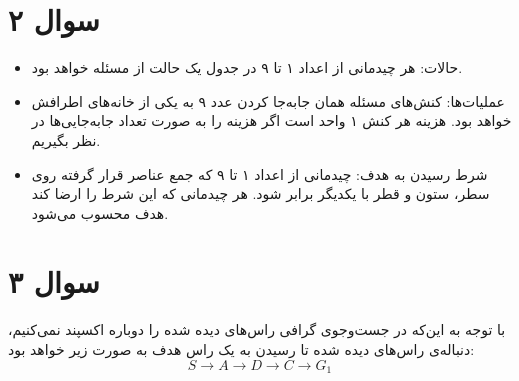 \documentclass[a4paper, 11pt]{article}
\begin{document}
\section{سوال ۲}
\begin{itemize}
	\item حالات:
	هر چیدمانی از اعداد ۱ تا ۹ در جدول یک حالت از مسئله خواهد بود.
	\item عملیات‌ها:
	کنش‌های مسئله همان جابه‌جا کردن عدد ۹ به یکی از خانه‌های اطرافش خواهد بود. هزینه هر کنش ۱ واحد است اگر هزینه را به صورت تعداد جابه‌جایی‌ها در نظر بگیریم.
	\item شرط رسیدن به هدف:
	چیدمانی از اعداد ۱ تا ۹ که جمع عناصر قرار گرفته روی سطر، ستون و قطر با یکدیگر برابر شود. هر چیدمانی که این شرط را ارضا کند هدف محسوب می‌شود.
\end{itemize}
\section{سوال ۳}
با توجه به این‌که در جست‌و‌جوی گرافی راس‌های دیده شده را دوباره اکسپند نمی‌کنیم، دنباله‌ی راس‌های دیده شده تا رسیدن به یک راس هدف به صورت زیر خواهد بود:
\[
S \to A \to D \to C \to G_1
\]	
	
	
\end{document}
